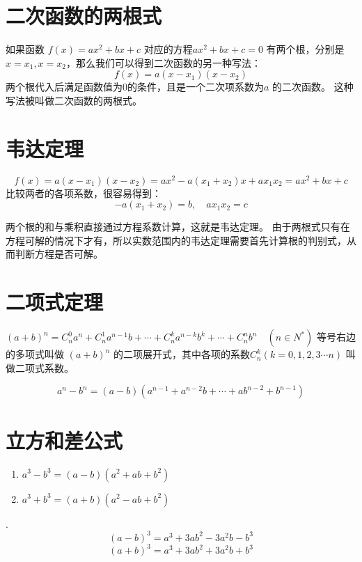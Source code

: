 \documentclass[a4paper,12pt]{ctexart}
\begin{document}
\section*{二次函数的两根式}

如果函数 $f(x) = ax^2 + bx + c$ 对应的方程$ax^2 + bx + c = 0$ 有两个根，分别是 $x = x_1, x = x_2$，那么我们可以得到二次函数的另一种写法：
\[ f(x) = a(x - x_1)(x - x_2) \]
两个根代入后满足函数值为0的条件，且是一个二次项系数为$a$ 的二次函数。
这种写法被叫做二次函数的两根式。

\section*{韦达定理}

\[ f(x) = a(x - x_1)(x - x_2) = ax^2 - a(x_1 + x_2)x + ax_1 x_2 = ax^2 + bx + c \]
比较两者的各项系数，很容易得到：
\[ -a(x_1 + x_2) = b, \quad ax_1 x_2 = c \]

两个根的和与乘积直接通过方程系数计算，这就是韦达定理。
由于两根式只有在方程可解的情况下才有，所以实数范围内的韦达定理需要首先计算根的判别式，从而判断方程是否可解。

\section*{二项式定理}

$(a+b)^n = C_n^0 a^n + C_n^1 a^{n-1}b + \cdots + C_n^k a^{n-k}b^k + \cdots + C_n^n b^n \quad (n \in N^*)$ 等号右边的多项式叫做 $(a+b)^n$ 的二项展开式，其中各项的系数$C_n^k (k=0,1,2,3 \cdots n)$ 叫做二项式系数。

\[ a^n - b^n = (a-b)(a^{n-1} + a^{n-2}b + \cdots + ab^{n-2} + b^{n-1}) \]

\section*{立方和差公式}

\begin{enumerate}
    \item $a^3 - b^3 = (a-b)(a^2 + ab + b^2)$
    \item $a^3 + b^3 = (a+b)(a^2 - ab + b^2)$
\end{enumerate}

.
\[ (a-b)^3 = a^3 + 3ab^2 - 3a^2b - b^3 \]
\[ (a+b)^3 = a^3 + 3ab^2 + 3a^2b + b^3 \]
\end{document}
